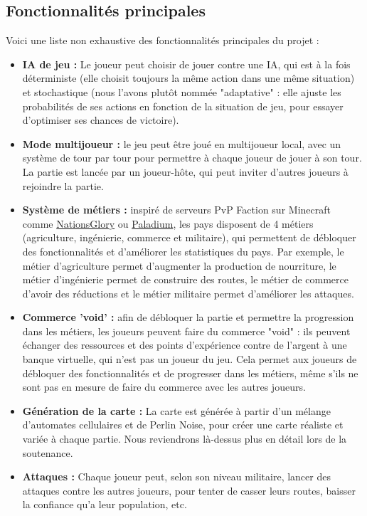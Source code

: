 \documentclass{article}
\begin{document}
\subsection{Fonctionnalités principales}
Voici une liste non exhaustive des fonctionnalités principales du projet :
\begin{itemize}
    \item \textbf{IA de jeu :} Le joueur peut choisir de jouer contre une IA, qui est à la fois déterministe (elle choisit toujours la même action dans une même situation) et stochastique (nous l'avons plutôt nommée "adaptative" : elle ajuste les probabilités de ses actions en fonction de la situation de jeu, pour essayer d'optimiser ses chances de victoire).
    \item \textbf{Mode multijoueur :} le jeu peut être joué en multijoueur local, avec un système de tour par tour pour permettre à chaque joueur de jouer à son tour. La partie est lancée par un joueur-hôte, qui peut inviter d'autres joueurs à rejoindre la partie.
    \item \textbf{Système de métiers :} inspiré de serveurs PvP Faction sur Minecraft comme \href{https://nationsglory.fr}{NationsGlory} ou \href{https://paladium-pvp.fr}{Paladium}, les pays disposent de 4 métiers (agriculture, ingénierie, commerce et militaire), qui permettent de débloquer des fonctionnalités et d'améliorer les statistiques du pays. Par exemple, le métier d'agriculture permet d'augmenter la production de nourriture, le métier d'ingénierie permet de construire des routes, le métier de commerce d'avoir des réductions et le métier militaire permet d'améliorer les attaques.
    \item \textbf{Commerce 'void' :} afin de débloquer la partie et permettre la progression dans les métiers, les joueurs peuvent faire du commerce "void" : ils peuvent échanger des ressources et des points d'expérience contre de l'argent à une banque virtuelle, qui n'est pas un joueur du jeu. Cela permet aux joueurs de débloquer des fonctionnalités et de progresser dans les métiers, même s'ils ne sont pas en mesure de faire du commerce avec les autres joueurs.
    \item \textbf{Génération de la carte :} La carte est générée à partir d'un mélange d'automates cellulaires et de Perlin Noise, pour créer une carte réaliste et variée à chaque partie. Nous reviendrons là-dessus plus en détail lors de la soutenance.
    \item \textbf{Attaques :} Chaque joueur peut, selon son niveau militaire, lancer des attaques contre les autres joueurs, pour tenter de casser leurs routes, baisser la confiance qu'a leur population, etc.
\end{itemize}
\end{document}
